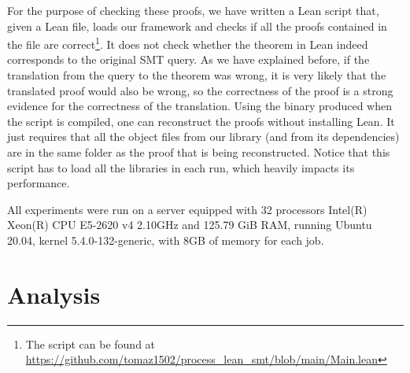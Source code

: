 For the purpose of checking these proofs, we have written a Lean script that, given
a Lean file, loads our framework and checks if all the proofs contained in the file
are correct\footnote{The script can
  be found at \url{https://github.com/tomaz1502/process_lean_smt/blob/main/Main.lean}}.
%
It does not check whether the theorem in Lean indeed corresponds to the original SMT query.
%
As we have explained before, if the translation from the query to the theorem was wrong,
it is very likely that the translated proof would also be wrong, so the correctness
of the proof is a strong evidence for the correctness of the translation.
%
Using the binary produced when the script is compiled, one can reconstruct the
proofs without installing Lean.
%
It just requires that all the object files from our library (and from its dependencies)
are in the same folder as the proof that is being reconstructed.
%
Notice that this script has to load all the libraries in each run, which heavily impacts
its performance.

All experiments were run on a server equipped with 32 processors Intel(R) Xeon(R)
CPU E5-2620 v4 2.10GHz and 125.79 GiB RAM, running Ubuntu 20.04,
kernel 5.4.0-132-generic, with 8GB of memory for each job.

\section{Analysis}




